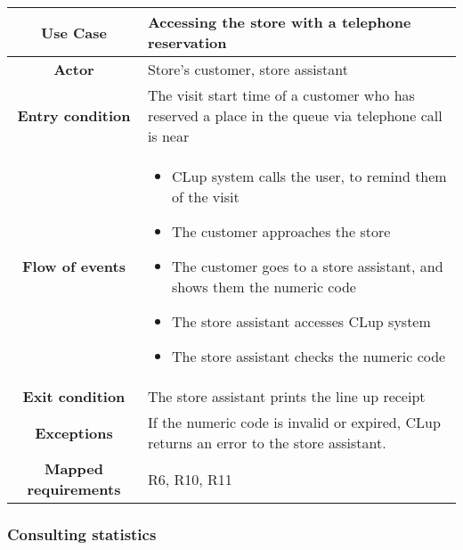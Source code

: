 \documentclass[../../main.tex]{subfiles}
\begin{document}
      \begin{table}[H]
        \centering
          \begin{tabular}{c m{}}
          \hline
          \textbf{Use Case} & Accessing the store with a telephone reservation\\ \hline
          \textbf{Actor} & Store's customer, store assistant\\ \hline
          \textbf{Entry condition} & The visit start time of a customer who has reserved a place in the queue via telephone call is near\\  \hline
          \textbf{Flow of events} & \begin{itemize}
                                      \item CLup system calls the user, to remind them of the visit
                                      \item The customer approaches the store
                                      \item The customer goes to a store assistant, and shows them the numeric code
                                      \item The store assistant accesses CLup system
                                      \item The store assistant checks the numeric code
                                    \end{itemize}\\ \hline
          \textbf{Exit condition} & The store assistant prints the line up receipt \\ \hline
          \textbf{Exceptions} & If the numeric code is invalid or expired, CLup returns an error to the store assistant.\\ \hline
          \textbf{Mapped requirements} & R6, R10, R11\\ \hline
          \end{tabular}
      \end{table}


      \subsubsection{Consulting statistics} %
\end{document}
